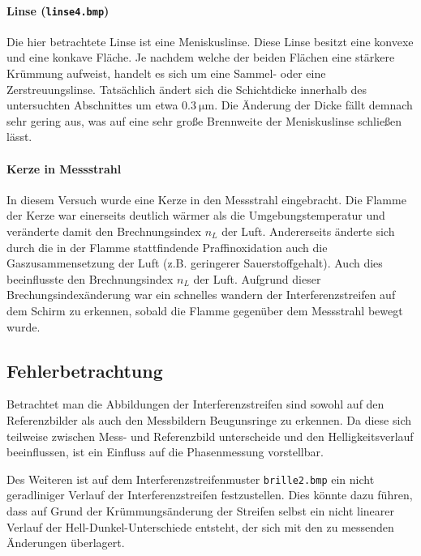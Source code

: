 \paragraph*{Linse (\texttt{linse4.bmp})}
Die hier betrachtete Linse ist eine Meniskuslinse. Diese Linse besitzt eine konvexe und eine konkave Fläche. Je nachdem welche der beiden Flächen eine stärkere Krümmung aufweist, handelt es sich um eine Sammel- oder eine Zerstreuungslinse. 
Tatsächlich ändert sich die Schichtdicke innerhalb des untersuchten Abschnittes um etwa $\SI{0.3}{\micro\meter}$. Die Änderung der Dicke fällt demnach sehr gering aus, was auf eine sehr große Brennweite der Meniskuslinse schließen lässt. 

\paragraph*{Kerze in Messstrahl}
In diesem Versuch wurde eine Kerze in den Messstrahl eingebracht. Die Flamme der Kerze war einerseits deutlich wärmer als die Umgebungstemperatur und veränderte damit den Brechnungsindex $n_L$ der Luft. Andererseits änderte sich durch die in der Flamme stattfindende Praffinoxidation auch die Gaszusammensetzung der Luft (z.B. geringerer Sauerstoffgehalt). Auch dies beeinflusste den Brechnungsindex $n_L$ der Luft. 
Aufgrund dieser Brechungsindexänderung war ein schnelles wandern der Interferenzstreifen auf dem Schirm zu erkennen, sobald die Flamme gegenüber dem Messstrahl bewegt wurde.

\subsection*{Fehlerbetrachtung}
Betrachtet man die Abbildungen der Interferenzstreifen sind sowohl auf den Referenzbilder als auch den Messbildern Beugunsringe zu erkennen. Da diese sich teilweise zwischen Mess- und Referenzbild unterscheide und den Helligkeitsverlauf beeinflussen, ist ein Einfluss auf die Phasenmessung vorstellbar.

Des Weiteren ist auf dem Interferenzstreifenmuster \texttt{brille2.bmp} ein nicht geradliniger Verlauf der Interferenzstreifen festzustellen. Dies könnte dazu führen, dass auf Grund der Krümmungsänderung der Streifen selbst ein nicht linearer Verlauf der Hell-Dunkel-Unterschiede entsteht, der sich mit den zu messenden Änderungen überlagert.



